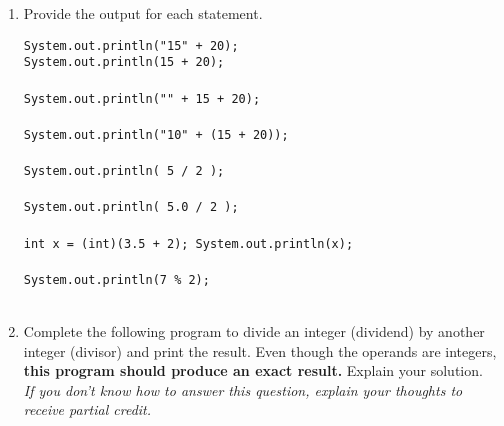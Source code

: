 \Instructions
\begin{enumerate}
\item {}
Provide the output for each statement.

\begin{oneparchoices} 
\hspace{0.2cm}
\vspace{2em} 
 \choice \texttt{System.out.println("15" + 20);} 
 \\
 
 \choice \texttt{System.out.println(15 + 20);} 
  \vspace{1em}
 \\ \\

 \choice \texttt{System.out.println("" + 15 + 20);}
 \vspace{1em}
 \\ \\
 
  \choice \texttt{System.out.println("10" + (15 + 20));}
  \vspace{1em}
 \\ \\

 \choice \texttt{System.out.println( 5 / 2 );}
 \vspace{1em}
 \\ \\
    
 \choice \texttt{System.out.println( 5.0 / 2 );}
 \vspace{1em}
 \\ \\
 
  \choice \texttt{int x = (int)(3.5 + 2); System.out.println(x);} 
  \vspace{1em}
 \\ \\
    
\choice \texttt{System.out.println(7 \% 2);}
\vspace{1em}
 \\ \\
    

 \end{oneparchoices}
 
 \item {}
Complete the following program to divide an integer (dividend) by another integer (divisor) and print the result. Even though the operands are integers, \textbf{this program should produce an exact result.} Explain your solution.
\\
\textit{If you don't know how to answer this question, explain your thoughts to receive partial credit.}


\end{enumerate}
